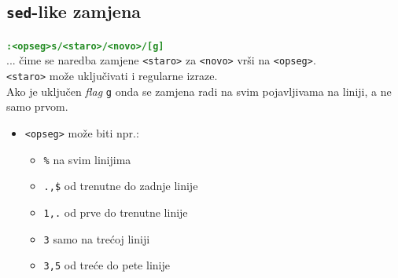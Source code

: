 \documentclass[10pt]{article}
\begin{document}
    \subsection*{\color{ForestGreen} \texttt{sed}-like zamjena}
    \begin{center}
        \large
        \textcolor{ForestGreen}{\texttt{\textbf{:<opseg>s/<staro>/<novo>/[g]}}}
        \\
        ... čime se naredba zamjene \texttt{<staro>} za \texttt{<novo>} vrši na \texttt{<opseg>}.
        \\
        \texttt{<staro>} može uključivati i regularne izraze.
        \\
        Ako je uključen \textit{flag} \texttt{g} onda se zamjena radi na svim pojavljivama na liniji, a ne samo prvom.
        \begin{itemize}
            \item \texttt{<opseg>} može biti npr.:
            \begin{itemize}
                \item \texttt{\%} na svim linijima
                \item \texttt{.,\$} od trenutne do zadnje linije
                \item \texttt{1,.} od prve do trenutne linije
                \item \texttt{3} samo na trećoj liniji
                \item \texttt{3,5} od treće do pete linije
            \end{itemize}
        \end{itemize}
    \end{center}
    \newpage

\end{document}
